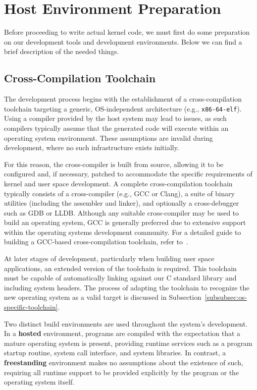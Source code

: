 \documentclass[a4paper,10pt,twoside]{report}
\theoremstyle{definition}
\begin{document}
\section{Host Environment Preparation}

Before proceeding to write actual kernel code, we must first do some preparation on our development tools and development environments. Below we can find a brief description of the needed things.

\subsection{Cross-Compilation Toolchain}
\label{subsec:theory_toolchain}

The development process begins with the establishment of a cross-compilation toolchain targeting a generic, OS-independent architecture (e.g., \texttt{x86-64-elf}). Using a compiler provided by the host system may lead to issues, as such compilers typically assume that the generated code will execute within an operating system environment. These assumptions are invalid during development, where no such infrastructure exists initially.

For this reason, the cross-compiler is built from source, allowing it to be configured and, if necessary, patched to accommodate the specific requirements of kernel and user space development. A complete cross-compilation toolchain typically consists of a cross-compiler (e.g., GCC or Clang), a suite of binary utilities (including the assembler and linker), and optionally a cross-debugger such as GDB or LLDB. Although any suitable cross-compiler may be used to build an operating system, GCC is generally preferred due to extensive support within the operating systems development community. For a detailed guide to building a GCC-based cross-compilation toolchain, refer to~\cite{osdev-gcc-cross-compiler}.

At later stages of development, particularly when building user space applications, an extended version of the toolchain is required. This toolchain must be capable of automatically linking against our C standard library and including system headers. The process of adapting the toolchain to recognize the new operating system as a valid target is discussed in Subsection~\ref{subsubsec:os-specific-toolchain}.

Two distinct build environments are used throughout the system's development. In a \textbf{hosted} environment, programs are compiled with the expectation that a mature operating system is present, providing runtime services such as a program startup routine, system call interface, and system libraries. In contrast, a \textbf{freestanding} environment makes no assumptions about the existence of such, requiring all runtime support to be provided explicitly by the program or the operating system itself.
\end{document}
